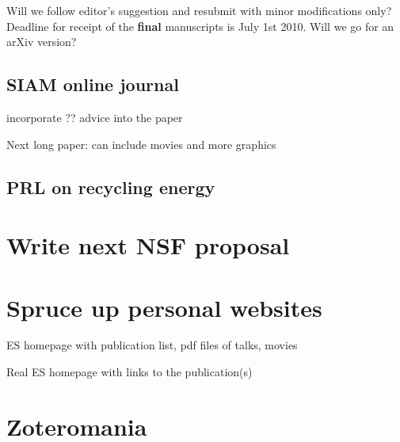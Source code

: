Will we follow editor's suggestion and resubmit with minor modifications only?
Deadline for receipt of the {\bf final} manuscripts is July 1st 2010.
Will we go for an arXiv version?

\subsection{SIAM online journal}

incorporate ?? advice into the paper

Next long paper: can include movies and more graphics

\subsection{PRL on recycling energy}

\section{Write next NSF proposal }

\section{Spruce up personal websites}

ES homepage with publication list, pdf files of talks, movies

Real ES homepage with links to the publication(s)

\section{Zoteromania}

